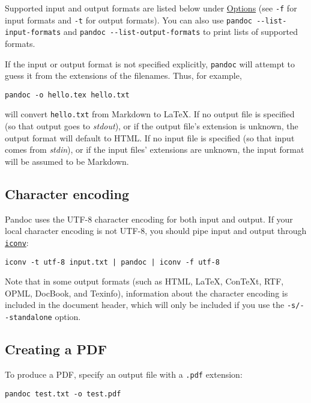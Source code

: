 Supported input and output formats are listed below under
\protect\hyperlink{options}{Options} (see \texttt{-f} for input formats
and \texttt{-t} for output formats). You can also use
\texttt{pandoc\ -\/-list-input-formats} and
\texttt{pandoc\ -\/-list-output-formats} to print lists of supported
formats.

If the input or output format is not specified explicitly,
\texttt{pandoc} will attempt to guess it from the extensions of the
filenames. Thus, for example,

\begin{verbatim}
pandoc -o hello.tex hello.txt
\end{verbatim}

will convert \texttt{hello.txt} from Markdown to LaTeX. If no output
file is specified (so that output goes to \emph{stdout}), or if the
output file's extension is unknown, the output format will default to
HTML. If no input file is specified (so that input comes from
\emph{stdin}), or if the input files' extensions are unknown, the input
format will be assumed to be Markdown.

\hypertarget{character-encoding}{%
\subsection{Character encoding}\label{character-encoding}}

Pandoc uses the UTF-8 character encoding for both input and output. If
your local character encoding is not UTF-8, you should pipe input and
output through
\href{http://www.gnu.org/software/libiconv/}{\texttt{iconv}}:

\begin{verbatim}
iconv -t utf-8 input.txt | pandoc | iconv -f utf-8
\end{verbatim}

Note that in some output formats (such as HTML, LaTeX, ConTeXt, RTF,
OPML, DocBook, and Texinfo), information about the character encoding is
included in the document header, which will only be included if you use
the \texttt{-s/-\/-standalone} option.

\hypertarget{creating-a-pdf}{%
\subsection{Creating a PDF}\label{creating-a-pdf}}

To produce a PDF, specify an output file with a \texttt{.pdf} extension:

\begin{verbatim}
pandoc test.txt -o test.pdf
\end{verbatim}

